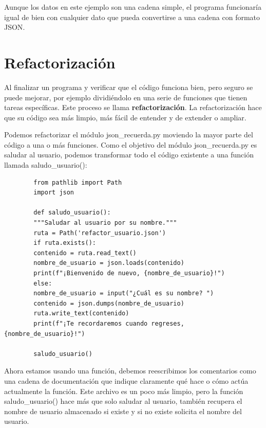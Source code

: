 {	Aunque los datos en este ejemplo son  una cadena simple, el programa funcionaría igual de bien con cualquier dato que pueda convertirse a una cadena con formato {\ttfamily JSON}.
	
	\section{Refactorización}       %
	
	Al finalizar un programa y verificar que el código funciona bien, pero seguro se puede mejorar, por ejemplo  dividiéndolo en una serie de funciones que tienen tareas específicas. Este proceso se llama {\bf \ttfamily refactorización}. La refactorización hace que su código sea más limpio, más fácil de entender y de extender o ampliar.
	
	Podemos {\ttfamily refactorizar} el módulo {\ttfamily json\_recuerda.py} moviendo la mayor parte del código a una o más funciones. Como el objetivo del módulo {\ttfamily json\_recuerda.py} es saludar al usuario, podemos transformar todo el código existente a una función llamada {\ttfamily saludo\_usuario()}:
	
	\hspace{-2.5cm}{\ttfamily \scriptsize saludo\_}
	
	\vspace{-0.2cm}
	\hspace{-2.5cm}{\ttfamily \scriptsize usuario.py}\vspace{-0.88cm}
	\begin{lstlisting}
		from pathlib import Path
		import json
		
		def saludo_usuario():
		"""Saludar al usuario por su nombre."""
		ruta = Path('refactor_usuario.json')
		if ruta.exists():
		contenido = ruta.read_text()
		nombre_de_usuario = json.loads(contenido)
		print(f"¡Bienvenido de nuevo, {nombre_de_usuario}!")
		else:
		nombre_de_usuario = input("¿Cuál es su nombre? ")
		contenido = json.dumps(nombre_de_usuario) 
		ruta.write_text(contenido)
		print(f"¡Te recordaremos cuando regreses, {nombre_de_usuario}!")
		
		saludo_usuario()
	\end{lstlisting}
	
	
	Ahora estamos usando una función, debemos reescribimos los comentarios como una cadena de documentación que indique claramente qué hace  o    cómo actúa actualmente la función. Este archivo es un poco más limpio, pero la función {\ttfamily saludo\_usuario()} hace más que solo saludar al usuario, también recupera el nombre de usuario almacenado si existe y si no existe solicita el nombre del usuario. 
	
}
